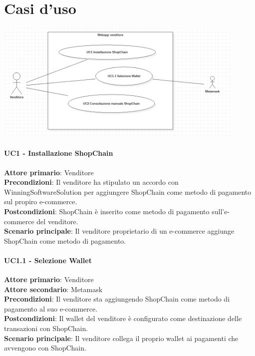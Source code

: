 \documentclass[a4paper, 12pt]{article}
\begin{document}
\section{Casi d'uso}

\includegraphics[width=0.9\textwidth]{uc01}

\paragraph{UC1 - Installazione ShopChain}
\textbf{Attore primario}: Venditore\\
\textbf{Precondizioni}: Il venditore ha stipulato un accordo con WinningSoftwareSolution per aggiungere ShopChain come metodo di pagamento sul propiro e-commerce.\\
\textbf{Postcondizioni}: ShopChain è inserito come metodo di pagamento sull'e-commerce del venditore.\\
\textbf{Scenario principale}:
Il venditore proprietario di un e-commerce aggiunge ShopChain come metodo di pagamento.

\paragraph{UC1.1 - Selezione Wallet}
\textbf{Attore primario}: Venditore\\
\textbf{Attore secondario}: Metamask\\
\textbf{Precondizioni}: Il venditore sta aggiungendo ShopChain come metodo di pagamento al suo e-commerce.\\
\textbf{Postcondizioni}: Il wallet del venditore è configurato come destinazione delle transazioni con ShopChain.\\
\textbf{Scenario principale}: Il venditore collega il proprio wallet ai pagamenti che avvengono con ShopChain.
\end{document}
